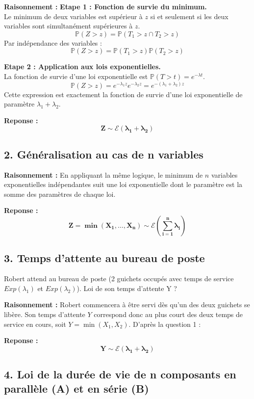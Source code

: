\documentclass[11pt,a4paper]{article}
\begin{document}
\textbf{Raisonnement :}
\textbf{Etape 1 : Fonction de survie du minimum.}\\
Le minimum de deux variables est supérieur à $z$ si et seulement si les deux variables sont simultanément supérieures à $z$.
$$ \mathbb{P}(Z > z) = \mathbb{P}(T_1 > z \cap T_2 > z) $$
Par indépendance des variables :
$$ \mathbb{P}(Z > z) = \mathbb{P}(T_1 > z) \mathbb{P}(T_2 > z) $$

\textbf{Etape 2 : Application aux lois exponentielles.}\\
La fonction de survie d'une loi exponentielle est $\mathbb{P}(T > t) = e^{-\lambda t}$.
$$ \mathbb{P}(Z > z) = e^{-\lambda_1 z} e^{-\lambda_2 z} = e^{-(\lambda_1 + \lambda_2)z} $$
Cette expression est exactement la fonction de survie d'une loi exponentielle de paramètre $\lambda_1 + \lambda_2$.

\textbf{Reponse :}
$$ \mathbf{Z \sim \mathcal{E}(\lambda_1 + \lambda_2)} $$

\subsection*{2. Généralisation au cas de n variables}

\textbf{Raisonnement :} En appliquant la même logique, le minimum de $n$ variables exponentielles indépendantes suit une loi exponentielle dont le paramètre est la somme des paramètres de chaque loi.

\textbf{Reponse :}
$$ \mathbf{Z = \min(X_1, \dots, X_n) \sim \mathcal{E}\left(\sum_{i=1}^n \lambda_i\right)} $$

\subsection*{3. Temps d'attente au bureau de poste}

Robert attend au bureau de poste (2 guichets occupés avec temps de service $Exp(\lambda_1)$ et $Exp(\lambda_2)$). Loi de son temps d'attente Y ?

\textbf{Raisonnement :} Robert commencera à être servi dès qu'un des deux guichets se libère. Son temps d'attente $Y$ correspond donc au plus court des deux temps de service en cours, soit $Y = \min(X_1, X_2)$. D'après la question 1 :

\textbf{Reponse :}
$$ \mathbf{Y \sim \mathcal{E}(\lambda_1 + \lambda_2)} $$

\subsection*{4. Loi de la durée de vie de n composants en parallèle (A) et en série (B)}
\end{document}
